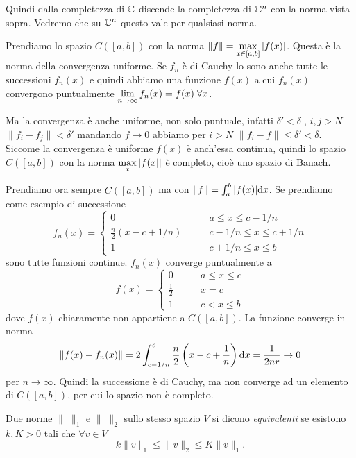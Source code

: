 Quindi dalla completezza di $\mathbb C$ discende la completezza di $\mathbb C^n$ con
la norma vista sopra. Vedremo che su $\mathbb C^n$ questo vale per qualsiasi norma.
\begin{example}
Prendiamo lo spazio $C([a, b])$ con la norma 
$\|f\| = \displaystyle \max_{x \in [a, b]} {\left|f(x)\right|}$.
Questa è la norma della convergenza uniforme. Se $f_n$ è di Cauchy lo sono
anche tutte le successioni $f_n(x)$ e quindi abbiamo una funzione $f(x)$ a
cui $f_n(x)$ convergono puntualmente $\displaystyle \lim_{n \to \infty} f_n(x) = f(x)\;
\forall x$.

Ma la convergenza è anche uniforme, non solo puntuale, infatti 
$\delta' < \delta \;$, $i,j>N$ $\|f_i-f_j\|<\delta'$ mandando $f\to 0$
abbiamo per $i>N$ $\|f_i-f\|\leq \delta'<\delta$. Siccome la convergenza è
uniforme $f(x)$ è anch'essa continua, quindi lo spazio $C([a,b])$ con
la norma $\displaystyle \max_{x}{\left|f(x\right|}|$ è completo, cioè uno spazio di Banach.
\end{example}
\begin{example}
	
Prendiamo ora sempre $C([a, b])$ ma con $\|f\| = \int_{a}^b {\left|f(x)\right|} \mathrm{d} x$.
Se prendiamo come esempio di successione
\[
f_n(x)=\begin{cases}
0 \qquad &a\leq x \leq c - 1/n\\
\frac{n}{2}(x - c + 1/n) \qquad &c - 1/n \leq x \leq c + 1/n\\
1 \qquad &c + 1/n \leq x \leq b
\end{cases}
\]
sono tutte funzioni continue. $f_n(x)$ converge puntualmente a
\[
f(x) = \begin{cases}
0 \qquad &a \leq x \leq c\\
\frac{1}{2} \qquad &x = c\\
1 \qquad &c < x \leq b
\end{cases}
\]
dove $f(x)$ chiaramente non appartiene a $C([a, b])$. La funzione converge in norma
\[
\|f(x) - f_n(x)\| = 2\int_{c - 1/n}^c \frac{n}{2} \left(x - c + \frac{1}{n}\right)
\mathrm{d} x = \frac{1}{2nr} \to 0
\]
per $n \to \infty$. Quindi la successione è di Cauchy, ma non converge ad un elemento di
$C([a, b])$, per cui lo spazio non è completo.
\end{example}

\begin{definition}
Due norme $\|\;\|_1$ e $\|\;\|_2$ sullo stesso spazio $V$ si dicono \emph{equivalenti}
se esistono $k, K > 0$ tali che $\forall v \in V$ 
\[
	k\|v\|_1\leq \|v\|_2\leq K\|v\|_1
.\]
\end{definition}

